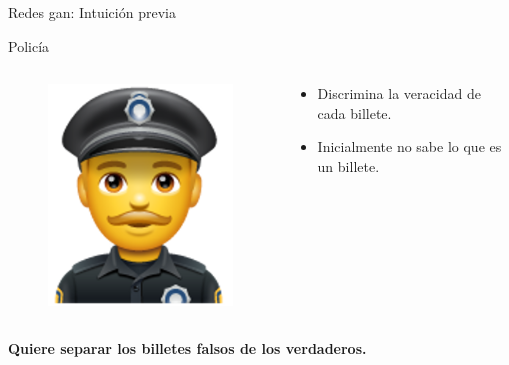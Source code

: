 \begin{frame}{Redes \gls{gan}: Intuición previa}

    {\Large Policía}
    \hfill
    
    \begin{columns}[T]
    \begin{column}{.3\textwidth}
    
    \begin{figure}
        \centering
        \includegraphics[width=\textwidth]{Slides/figures/GAN/Policia.PNG}
    \end{figure}
    
    \end{column}
    \hfill
    \begin{column}{.68\textwidth}
    
    \begin{itemize}
        \item \alert{Discrimina} la veracidad de cada billete.
        \item Inicialmente \alert{no sabe} lo que es un billete.
    \end{itemize}

    \end{column}
    \end{columns}
    
    \vfill
    \centering
    \textbf{\Large Quiere \alert{separar} los billetes \alert{falsos} de los \alert{verdaderos}.}
    
\end{frame}

